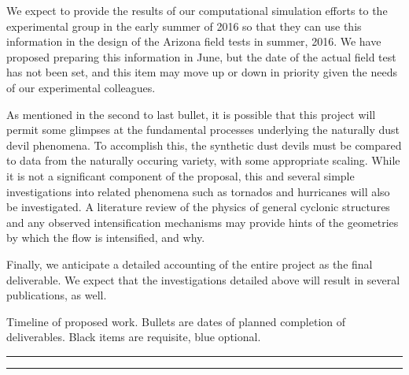 We expect to provide the results of our computational
simulation efforts to the experimental group in the early summer of 2016
so that they can use this information in the design of the
Arizona field tests in summer, 2016. We have proposed preparing this
information in June, but the date of the actual field test has not been
set, and this item may move up or down in priority given the needs of
our experimental colleagues. 

As mentioned in the second to last bullet, it is possible that this
project will permit some glimpses  
at the fundamental processes underlying the naturally dust devil
phenomena. To accomplish this, the synthetic dust devils must be
compared to data from the naturally occuring variety,  with some
appropriate scaling. While it is not a significant component of the
proposal, this and several simple investigations into related phenomena
such as tornados and hurricanes will also  be investigated. A literature
review of the physics of general cyclonic structures and any observed
intensification mechanisms may provide hints of the geometries 
by which the flow is intensified, and why. 

Finally, we anticipate a detailed accounting of the entire project as
the final deliverable. We expect that the investigations detailed
above will result in several publications, as well. 
%
%


\begin{center}
\begin{table}
\caption{Timeline of proposed work. Bullets are dates of planned
 completion of deliverables. Black items are requisite, blue optional.}
\centering
\begin{minipage}[t]{.7\linewidth}
\color{black}
\rule{\linewidth}{1pt}
\bigskip
\rule{\linewidth}{1pt}%
\end{minipage}%
\end{table}
\label{tab:prop}
\end{center}

